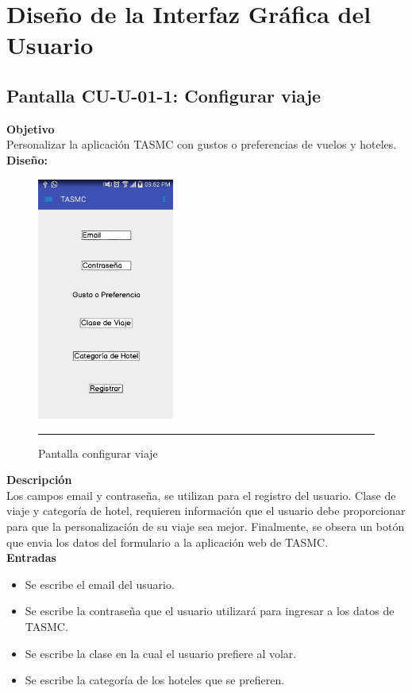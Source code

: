 \clearpage
\section{Diseño de la Interfaz Gráfica del Usuario}

\hypertarget{CU-U-01-1}{}
\subsection{Pantalla CU-U-01-1: Configurar viaje}
\textbf{Objetivo}\\
Personalizar la aplicación TASMC con gustos o preferencias de vuelos y hoteles. \\

\textbf{Diseño:}
\begin{figure}[h]
	\centering
		\includegraphics[width=0.4\textwidth]{Figuras/intConfiguracion.png}
		\rule{30em}{0.5pt}
	\caption[Pantalla configurar viaje]{Pantalla configurar viaje}
	\label{fig:intConfiguracion}
\end{figure}

\textbf{Descripción} \\
Los campos email y contraseña, se utilizan para el registro del usuario. Clase de viaje y categoría de hotel, requieren información que el usuario debe proporcionar para que la personalización de su viaje sea mejor. Finalmente, se obsera un botón que envia los datos del formulario a la aplicación web de TASMC. \\

\textbf{Entradas}
\begin{itemize}
\item Se escribe el email del usuario.
\item Se escribe la contraseña que el usuario utilizará para ingresar a los datos de TASMC.
\item Se escribe la clase en la cual el usuario prefiere al volar.
\item Se escribe la categoría de los hoteles que se prefieren. 
\end{itemize}

